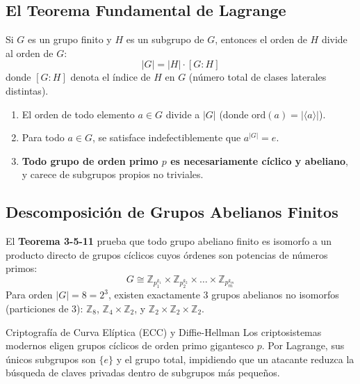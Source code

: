 \documentclass[11pt,a4paper]{article}
\begin{document}
\subsection{El Teorema Fundamental de Lagrange}
\begin{teorema}
Si $G$ es un grupo finito y $H$ es un subgrupo de $G$, entonces el orden de $H$ divide al orden de $G$:
\begin{equation}
  |G| = |H| \cdot [G : H]
\end{equation}
donde $[G : H]$ denota el índice de $H$ en $G$ (número total de clases laterales distintas).
\end{teorema}

\begin{teorema}
\begin{enumerate}[noitemsep]
  \item El orden de todo elemento $a \in G$ divide a $|G|$ (donde $\text{ord}(a) = |\langle a \rangle|$).
  \item Para todo $a \in G$, se satisface indefectiblemente que $a^{|G|} = e$.
  \item \textbf{Todo grupo de orden primo $p$ es necesariamente cíclico y abeliano}, y carece de subgrupos propios no triviales.
\end{enumerate}
\end{teorema}

\subsection{Descomposición de Grupos Abelianos Finitos}
El \textbf{Teorema 3-5-11} prueba que todo grupo abeliano finito es isomorfo a un producto directo de grupos cíclicos cuyos órdenes son potencias de números primos:
\begin{equation*}
  G \cong \mathbb{Z}_{p_1^{k_1}} \times \mathbb{Z}_{p_2^{k_2}} \times \dots \times \mathbb{Z}_{p_m^{k_m}}
\end{equation*}
Para orden $|G| = 8 = 2^3$, existen exactamente 3 grupos abelianos no isomorfos (particiones de 3): $\mathbb{Z}_8$, $\mathbb{Z}_4 \times \mathbb{Z}_2$, y $\mathbb{Z}_2 \times \mathbb{Z}_2 \times \mathbb{Z}_2$.

\begin{aplicacion}{Criptografía de Curva Elíptica (ECC) y Diffie-Hellman}
Los criptosistemas modernos eligen grupos cíclicos de orden primo gigantesco $p$. Por Lagrange, sus únicos subgrupos son $\{e\}$ y el grupo total, impidiendo que un atacante reduzca la búsqueda de claves privadas dentro de subgrupos más pequeños.
\end{aplicacion}
\end{document}
